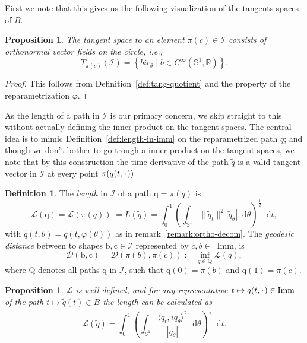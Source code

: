 \documentclass[a4,danish]{article}
\theoremstyle{break}
\newtheorem{proposition}[subsection]{Proposition}
\theoremstyle{definition}
\newtheorem{definition}[subsection]{Definition}
\theoremstyle{Break}
\newcommand{\R}{\mathbb{R}}
\newcommand*\I{\mathop{}\!\mathrm{Imm}}
\renewcommand{\S}{\mathbb{S}}
\newcommand{\blank}{\makebox[1ex]{\textbf{$\cdot$}}}
\renewcommand{\phi}{\varphi}
\newcommand*\diff{\mathop{}\!\mathrm{d}}
\begin{document}
First we note that this gives us the following visualization of the tangents spaces of $B$.

\begin{proposition}
The tangent space to an element $\pi(c) \in \mathcal{I}$ consists of orthonormal vector fields on the circle, i.e.,
  \begin{equation*}
    T_{\pi(c)}(\mathcal{I}) = 
    \left\{
      b i c_{\theta} \mid b \in C^{\infty}(\S^1,\R)
    \right\}.
  \end{equation*}
\end{proposition}

\begin{proof}
  This follows from Definition~\ref{def:tang-quotient} and the property of the reparametrization $\phi$. 
\end{proof}

As the length of a path in $\mathcal{I}$ is our primary concern, we skip straight to this without actually defining the inner product on the tangent spaces. The central idea is to mimic Definition~\ref{def:length-in-imm} on the reparametrized path $\tilde{q}$; and though we don't bother to go trough a inner product on the tangent spaces, we note that by this construction the time derivative of the path $\tilde{q}$ is a valid tangent vector in $\mathcal{I}$ at every point $\pi(q(t,\blank))$

\begin{definition}
  The \textit{length} in $\mathcal{I}$ of a path $\mathrm{q}=\pi(q)$ is
  \begin{equation*}
    \mathcal{L}(\mathrm{q})= \mathcal{L}(\pi(q)) := L(\tilde{q}) = 
    \int_{0}^{1}
    \left(
      \int_{\S^{1}} \|\tilde{q}_t\|^2 |\tilde{q}_{\theta}| \diff \theta
    \right)^{\frac{1}{2}}
    \diff t,
  \end{equation*}
  with $\tilde{q}(t,\theta)=q(t,\phi(\theta))$ as in remark~\ref{remark:ortho-decom}. 
  The \textit{geodesic distance} between to shapes $\mathrm{b}, \mathrm{c} \in \mathcal{I}$ represented by $c,b \in \I$, is
  \begin{equation*}
    \mathcal{D}(\mathrm{b},\mathrm{c}) = \mathcal{D}(\pi(b),\pi(c)) := \inf_{q \in \mathrm{Q}} \mathcal{L}(q),
  \end{equation*}
  where $\mathrm{Q}$ denotes all paths $\mathrm{q}$ in $\mathcal{I}$, such that $\mathrm{q}(0)=\pi(b)$ and $\mathrm{q}(1)=\pi(c)$. 
\end{definition}

\begin{proposition}
    $\mathcal{L}$ is well-defined, and for any representative $t \mapsto q(t, \blank) \in \I $ of the path $t \mapsto \tilde{q}(t) \in B$ the length can be calculated as
    \begin{equation}
      \label{eq:length-quotient}
    \mathcal{L}(\tilde{q}) = \int_{0}^{1} 
    \left(
      \int_{\S^1}  \frac{\langle q_t, i q_{\theta}\rangle^2}{|q_{\theta}|} \diff \theta
    \right)^{\frac{1}{2}} \diff t.
  \end{equation}
\end{proposition}
\end{document}
